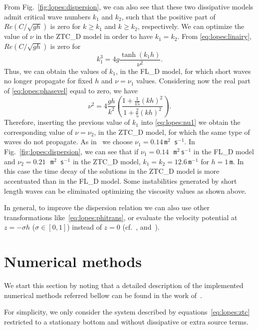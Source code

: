 \noindent From Fig.~\ref{fig:lopes:dispersion}, we can also see that
these two dissipative models admit critical wave numbers
$k_1$ and $k_2$, such that the positive part of
$\displaystyle Re\left(C/\sqrt{gh}\right)$ is zero for
$k\geq k_1$ and $k\geq k_2$, respectively.
We can optimize the value of $\nu$ in the ZTC\_D model in
order to have $k_1=k_2$.
From \eqref{eq:lopes:linairy},  $\displaystyle
Re\left(C/\sqrt{gh}\right)$ is zero for
\begin{equation}
k_1^3=4g\frac{\tanh{(k_1h)}}{\nu^2}.
\end{equation}
Thus, we can obtain the values of $k_1$, in the FL\_D model,
for which short waves no longer propagate for fixed $h$ and
$\nu=\nu_1$ values.  Considering now the real part of
\eqref{eq:lopes:phasevel} equal to zero, we have
\begin{equation}\label{eq:lopes:nu1}
\nu^2=4\frac{gh}{k^2}\left(\frac{1+\frac{1}{15}(kh)^2}{1+\frac{2}{5}(kh)^2}\right).
\end{equation}
Therefore, inserting the previous value of $k_1$ into
\eqref{eq:lopes:nu1} we obtain the corresponding value of
$\nu=\nu_2$, in the ZTC\_D model, for which the same type of waves
do not propagate.
As in~\cite{DutykhDias2007} we choose $\nu_1=0.14$\,{\tt m$^2$\,s$^{-1}$}.
In Fig.~\ref{fig:lopes:dispersion}, we can
see that if $\nu_1=0.14\,$~{\tt m$^2\,$s$^{-1}$} in
the FL\_D model   and $\nu_2=0.21\,$~{\tt m$^2$\,s$^{-1}$}
in the ZTC\_D model, $k_1=k_2=12.6$\,{\tt m$^{-1}$}
for $h=1$\,{\tt m}.
In this case the time decay of the solutions in
the ZTC\_D model is more accentuated than in the FL\_D
model.
Some instabilities  generated by short length waves can
be eliminated optimizing the viscosity values as shown above.

In general, to improve the dispersion relation we can also
use other transformations like~\eqref{eq:lopes:phitrans}, or
evaluate the velocity potential at $z=-\sigma h$
($\sigma\in[0,1]$) instead of $z=0$
(cf.~\cite{BinghamMadsenFuhrman2008}, \cite{MadsenAgnon2003}
and~\cite{MadsenBinghamSchaffer2003}).


\section{Numerical methods}\label{sec:lopes:numericalmethods}
We start this section by noting that a detailed description
of the implemented numerical methods referred bellow can be
found in the work of~\cite{Lopes2007}.

For simplicity, we only consider the system described by
equations~\eqref{eq:lopes:ztc} restricted to a stationary
bottom and without dissipative
or extra source terms.

